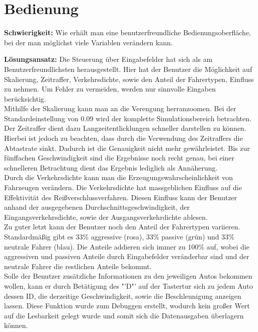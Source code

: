 \section{Bedienung}
\textbf{Schwierigkeit:} Wie erhält man eine benutzerfreundliche Bedienungsoberfläche, bei der man möglichst viele Variablen verändern kann.
\begin{addmargin}[25pt]{0pt}
	\item \textbf{Lösungsansatz:} Die Steuerung über Eingabefelder hat sich als am Benutzerfreundlichsten herausgestellt. Hier hat der Benutzer die Möglichkeit auf Skalierung, Zeitraffer, Verkehrsdichte, sowie den Anteil der Fahrertypen, Einfluss zu nehmen. Um Fehler zu vermeiden, werden nur sinnvolle Eingaben berücksichtig.\\ 
	Mithilfe der Skalierung kann man an die Verengung herranzoomen. Bei der Standardeinstellung von 0.09 wird der komplette Simulationsbereich betrachten.\\ 
	Der Zeitraffer dient dazu Langzeitentlicklungen schneller darstellen zu können. Hierbei ist jedoch zu beachten, dass durch die Verwendung des Zeitraffers die Abtastrate sinkt. Dadurch ist die Genauigkeit nicht mehr gewährleistet. Bis zur fünffachen Geschwindigkeit sind die Ergebnisse noch recht genau, bei einer schnelleren Betrachtung dient das Ergebnis lediglich als Annäherung.\\
	Durch die Verkehrsdichte kann man die Erzeugungswahrscheinlichkeit von Fahrzeugen verändern. Die Verkehrsdichte hat massgeblichen Einfluss auf die Effektivität des Reißverschlussverfahren. Diesen Einfluss kann der Benutzer anhand der ausgegebenen Durchschnittsgeschwindigkeit, der Eingangsverkehrsdichte, sowie der Ausgangsverkehrdichte ablesen.\\
	Zu guter letzt kann der Benutzer noch den Anteil der Fahrertypen variieren. Standardmäßig gibt es 33\% aggressive (rosa), 33\% passive (grün) und 33\% neutrale Fahrer (blau). Die Anteile addieren sich immer zu 100\% auf, wobei die aggressiven und passiven Anteile durch Eingabefelder veränderbar sind und der neutrale Fahrer die restlichen Anteile bekommt.\\
	Solle der Benutzer zusätzliche Informationen zu den jeweiligen Autos bekommen wollen, kann er durch Betätigung des "'D"' auf der Tastertur sich zu jedem Auto dessen ID, die derzeitige Geschwindigkeit, sowie die Beschleunigung anzeigen lassen. Diese Funktion wurde zum Debuggen erstellt, wodurch kein großer Wert auf die Lesbarkeit gelegt wurde und somit sich die Datenausgaben überlagern können.\\
\end{addmargin}

